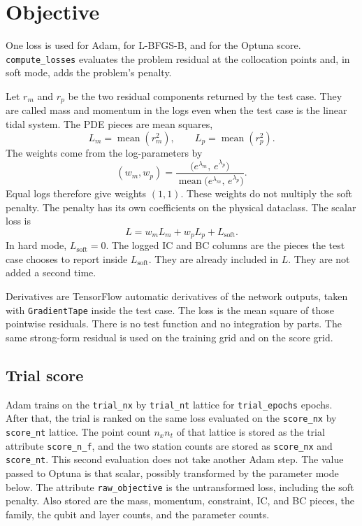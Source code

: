 \documentclass[11pt]{article}
\begin{document}
\section{Objective}
\label{sec:objective}

One loss is used for Adam, for L-BFGS-B, and for the Optuna score.
\texttt{compute\_losses} evaluates the problem residual at the collocation points and, in soft mode, adds the problem's penalty.

Let \(r_{m}\) and \(r_{p}\) be the two residual components returned by the test case.
They are called mass and momentum in the logs even when the test case is the linear tidal system.
The PDE pieces are mean squares,
\begin{equation}
L_{m}=\operatorname{mean}(r_{m}^{2}),\qquad
L_{p}=\operatorname{mean}(r_{p}^{2}).
\end{equation}
The weights come from the log-parameters by
\begin{equation}
(w_{m},w_{p})
=
\frac{\big(e^{\lambda_{m}},\,e^{\lambda_{p}}\big)}
{\operatorname{mean}\big(e^{\lambda_{m}},\,e^{\lambda_{p}}\big)}.
\end{equation}
Equal logs therefore give weights \((1,1)\).
These weights do not multiply the soft penalty.
The penalty has its own coefficients on the physical dataclass.
The scalar loss is
\begin{equation}
L = w_{m} L_{m} + w_{p} L_{p} + L_{\mathrm{soft}}.
\end{equation}
In hard mode, \(L_{\mathrm{soft}}=0\).
The logged IC and BC columns are the pieces the test case chooses to report inside \(L_{\mathrm{soft}}\).
They are already included in \(L\).
They are not added a second time.

Derivatives are TensorFlow automatic derivatives of the network outputs, taken with \texttt{GradientTape} inside the test case.
The loss is the mean square of those pointwise residuals.
There is no test function and no integration by parts.
The same strong-form residual is used on the training grid and on the score grid.

\subsection{Trial score}

Adam trains on the \texttt{trial\_nx} by \texttt{trial\_nt} lattice for \texttt{trial\_epochs} epochs.
After that, the trial is ranked on the same loss evaluated on the \texttt{score\_nx} by \texttt{score\_nt} lattice.
The point count \(n_{x}n_{t}\) of that lattice is stored as the trial attribute \texttt{score\_n\_f}, and the two station counts are stored as \texttt{score\_nx} and \texttt{score\_nt}.
This second evaluation does not take another Adam step.
The value passed to Optuna is that scalar, possibly transformed by the parameter mode below.
The attribute \texttt{raw\_objective} is the untransformed loss, including the soft penalty.
Also stored are the mass, momentum, constraint, IC, and BC pieces, the family, the qubit and layer counts, and the parameter counts.
\end{document}
